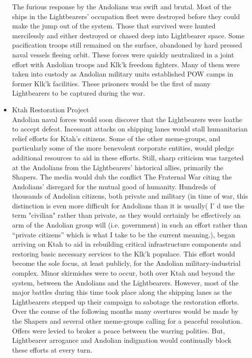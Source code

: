 \begin{itemize}
The furious response by the Andolians was swift and brutal.  Most of
the ships in the Lightbearers' occupation fleet were destroyed before
they could make the jump out of the system.  Those that survived were
hunted mercilessly and either destroyed or chased deep into
Lightbearer space.  Some pacification troops still remained on the
surface, abandoned by hard pressed naval vessels fleeing orbit.  These
forces were quickly neutralized in a joint effort with Andolian troops
and Klk'k freedom fighters.  Many of them were taken into custody as
Andolian military units established POW camps in former Klk'k
facilities.  These prisoners would be the first of many Lightbearers
to be captured during the war.

\item Ktah Restoration Project \\

Andolian naval forces would soon discover that the Lightbearers were
loathe to accept defeat.  Incessant attacks on shipping lanes would
stall humanitarian relief efforts for Ktah's citizens.  Some of the
other meme-groups, and particularly some of the more benevolent
corporate entities, would pledge additional resources to aid in these
efforts.  Still, sharp criticism was targeted at the Andolians from
the Lightbearers' historical allies, primarily the Shapers.  The media
would dub the conflict The Fraternal War citing the Andolians'
disregard for the mutual good of humanity.  Hundreds of thousands of
Andolian citizens, both private and military (in time of war, this
distinction is even more difficult for Andolians than it is usually( I'
d use the term "civilian" rather than private, as they would
certainly be effectively an arm of the Andolian group will
(i.e. government) in such an effort rather than ``private citizens''
which is what I take to be the current meaning.), began arriving on
Ktah to aid in rebuilding critical infrastructure components and
restoring basic necessary services to the Klk'k populace.  This effort
would become the sole focus, at least publicly, for the Andolian
military-industrial complex.  Minor skirmishes were to occur, both
over Ktah and beyond the system, between the Andolians and the
Lightbearers.  However, most of the major battles during this time
took place along the shipping lanes as the Lightbearers stepped up
their campaign to sabotage the restoration efforts.  Over the course
of the following months many overtures would be made by the Shapers
and several other meme-groups calling for a peaceful resolution.
Offers were levied to broker a peace between the warring polities.
But, Lightbearer arrogance and Andolian indignation would continually
block these efforts at every turn.


\end{itemize}
